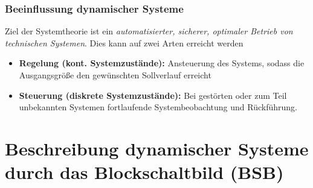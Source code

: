 \message{ !name(Mitschrieb_SysRegel.tex)}\documentclass[12pt,a4paper,ngerman]{scrartcl}
\begin{document}
\subsubsection*{Beeinflussung dynamischer Systeme}
Ziel der Systemtheorie ist ein \emph{automatisierter, sicherer, optimaler Betrieb von technischen Systemen}. Dies kann auf zwei Arten erreicht werden
\begin{itemize}
\item \textbf{Regelung (kont. Systemzustände):} Ansteuerung des Systems, sodass die Ausgangsgröße den gewünschten Sollverlauf erreicht
\item \textbf{Steuerung (diskrete Systemzustände):} Bei gestörten oder zum Teil unbekannten Systemen fortlaufende Systembeobachtung und Rückführung.
\end{itemize}

\section{Beschreibung dynamischer Systeme durch das Blockschaltbild (BSB)}
\end{document}
